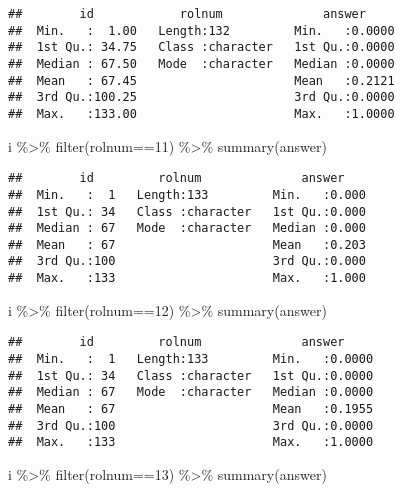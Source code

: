 \documentclass[
]{article}
\newenvironment{Shaded}{\begin{snugshade}}{\end{snugshade}}
\newcommand{\DecValTok}[1]{\textcolor[rgb]{0.00,0.00,0.81}{#1}}
\newcommand{\FunctionTok}[1]{\textcolor[rgb]{0.00,0.00,0.00}{#1}}
\newcommand{\NormalTok}[1]{#1}
\newcommand{\SpecialCharTok}[1]{\textcolor[rgb]{0.00,0.00,0.00}{#1}}
\begin{document}
\begin{enumerate}
\begin{verbatim}
##        id            rolnum              answer      
##  Min.   :  1.00   Length:132         Min.   :0.0000  
##  1st Qu.: 34.75   Class :character   1st Qu.:0.0000  
##  Median : 67.50   Mode  :character   Median :0.0000  
##  Mean   : 67.45                      Mean   :0.2121  
##  3rd Qu.:100.25                      3rd Qu.:0.0000  
##  Max.   :133.00                      Max.   :1.0000
\end{verbatim}

\begin{Shaded}
\begin{Highlighting}[]
\NormalTok{i }\SpecialCharTok{\%\textgreater{}\%} \FunctionTok{filter}\NormalTok{(rolnum}\SpecialCharTok{==}\DecValTok{11}\NormalTok{) }\SpecialCharTok{\%\textgreater{}\%} \FunctionTok{summary}\NormalTok{(answer)}
\end{Highlighting}
\end{Shaded}

\begin{verbatim}
##        id         rolnum              answer     
##  Min.   :  1   Length:133         Min.   :0.000  
##  1st Qu.: 34   Class :character   1st Qu.:0.000  
##  Median : 67   Mode  :character   Median :0.000  
##  Mean   : 67                      Mean   :0.203  
##  3rd Qu.:100                      3rd Qu.:0.000  
##  Max.   :133                      Max.   :1.000
\end{verbatim}

\begin{Shaded}
\begin{Highlighting}[]
\NormalTok{i }\SpecialCharTok{\%\textgreater{}\%} \FunctionTok{filter}\NormalTok{(rolnum}\SpecialCharTok{==}\DecValTok{12}\NormalTok{) }\SpecialCharTok{\%\textgreater{}\%} \FunctionTok{summary}\NormalTok{(answer)}
\end{Highlighting}
\end{Shaded}

\begin{verbatim}
##        id         rolnum              answer      
##  Min.   :  1   Length:133         Min.   :0.0000  
##  1st Qu.: 34   Class :character   1st Qu.:0.0000  
##  Median : 67   Mode  :character   Median :0.0000  
##  Mean   : 67                      Mean   :0.1955  
##  3rd Qu.:100                      3rd Qu.:0.0000  
##  Max.   :133                      Max.   :1.0000
\end{verbatim}

\begin{Shaded}
\begin{Highlighting}[]
\NormalTok{i }\SpecialCharTok{\%\textgreater{}\%} \FunctionTok{filter}\NormalTok{(rolnum}\SpecialCharTok{==}\DecValTok{13}\NormalTok{) }\SpecialCharTok{\%\textgreater{}\%} \FunctionTok{summary}\NormalTok{(answer)}
\end{Highlighting}
\end{Shaded}


\end{enumerate}
\end{document}
